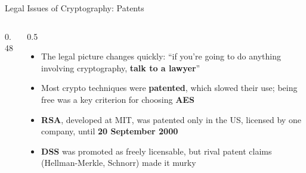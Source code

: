 \documentclass[aspectratio=169,11pt,xcolor={table}]{beamer}
\begin{document}
\begin{frame}{Legal Issues of Cryptography: Patents}
  \begin{columns}[c]
    \begin{column}{0.48\textwidth}
      \centering
    \end{column}
    \begin{column}{0.5\textwidth}
      \begin{itemize}\small\setlength{\itemsep}{3pt}
        \item The legal picture changes quickly: ``if you're going to do anything involving cryptography, \textbf{talk to a lawyer}''
        \item Most crypto techniques were \textbf{patented}, which slowed their use; being free was a key criterion for choosing \textbf{AES}
        \item \textbf{RSA}, developed at MIT, was patented only in the US, licensed by one company, until \textbf{20 September 2000}
        \item \textbf{DSS} was promoted as freely licensable, but rival patent claims (Hellman-Merkle, Schnorr) made it murky
      \end{itemize}
    \end{column}
  \end{columns}
\end{frame}
\end{document}
